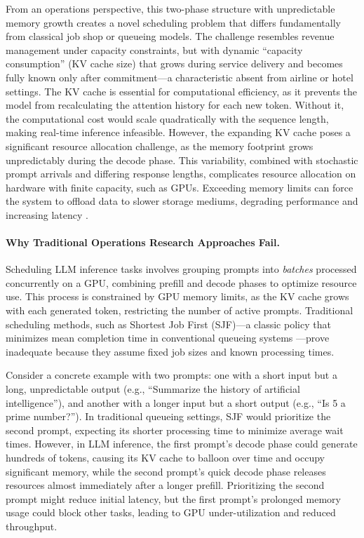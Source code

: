 From an operations perspective, this two-phase structure with unpredictable memory growth creates a novel scheduling problem that differs fundamentally from classical job shop or queueing models. The challenge resembles revenue management under capacity constraints, but with dynamic ``capacity consumption'' (KV cache size) that grows during service delivery and becomes fully known only after commitment---a characteristic absent from airline or hotel settings. The KV cache is essential for computational efficiency, as it prevents the model from recalculating the attention history for each new token. Without it, the computational cost would scale quadratically with the sequence length, making real-time inference infeasible. However, the expanding KV cache poses a significant resource allocation challenge, as the memory footprint grows unpredictably during the decode phase. This variability, combined with stochastic prompt arrivals and differing response lengths, complicates resource allocation on hardware with finite capacity, such as GPUs. Exceeding memory limits can force the system to offload data to slower storage mediums, degrading performance and increasing latency \citep{tay2022efficient, kang2024gear, hooper2025kvquant}.

\paragraph{Why Traditional Operations Research Approaches Fail.}
Scheduling LLM inference tasks involves grouping prompts into \textit{batches} processed concurrently on a GPU, combining prefill and decode phases to optimize resource use. This process is constrained by GPU memory limits, as the KV cache grows with each generated token, restricting the number of active prompts. Traditional scheduling methods, such as Shortest Job First (SJF)---a classic policy that minimizes mean completion time in conventional queueing systems \citep{conway1967theory}---prove inadequate because they assume fixed job sizes and known processing times. 

Consider a concrete example with two prompts: one with a short input but a long, unpredictable output (e.g., ``Summarize the history of artificial intelligence''), and another with a longer input but a short output (e.g., ``Is 5 a prime number?''). In traditional queueing settings, SJF would prioritize the second prompt, expecting its shorter processing time to minimize average wait times. However, in LLM inference, the first prompt's decode phase could generate hundreds of tokens, causing its KV cache to balloon over time and occupy significant memory, while the second prompt's quick decode phase releases resources almost immediately after a longer prefill. Prioritizing the second prompt might reduce initial latency, but the first prompt's prolonged memory usage could block other tasks, leading to GPU under-utilization and reduced throughput. 

